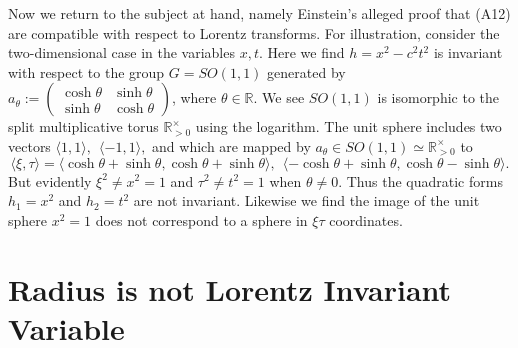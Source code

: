 \documentclass[12pt]{amsart}
\theoremstyle{definition}
\theoremstyle{remark}
\newcommand{\bR}{\mathbb{R}}
\newcommand{\del}{\partial}
\begin{document}
Now we return to the subject at hand, namely Einstein's alleged proof that (A12) are compatible with respect to Lorentz transforms. For illustration, consider the two-dimensional case in the variables $x,t$. Here we find $h=x^2-c^2 t^2$ is invariant with respect to the group $G=SO(1,1)$ generated by $a_\theta:=\begin{pmatrix} \cosh \theta & \sinh \theta \\
\sinh \theta & \cosh \theta
\end{pmatrix}$, where $\theta\in \bR$. We see $SO(1,1)$ is isomorphic to the split multiplicative torus $\bR^\times _{>0}$ using the logarithm. The unit sphere includes two vectors $\langle 1, 1 \rangle,~~ \langle -1,1\rangle,$ and which are mapped by $a_\theta \in SO(1,1) \simeq \bR^\times_{>0}$ to $$\langle \xi,\tau\rangle=\langle \cosh \theta+\sinh \theta, \cosh \theta+\sinh \theta \rangle,~~ \langle -\cosh \theta+\sinh \theta, \cosh \theta-\sinh \theta \rangle.$$ But evidently $\xi^2 \neq x^2=1$ and $\tau^2 \neq t^2=1$ when $\theta\neq 0$. Thus the quadratic forms $h_1=x^2$ and $h_2=t^2$ are not invariant. Likewise we find the image of the unit sphere $x^2=1$ does not correspond to a sphere in $\xi \tau$ coordinates. %


\section{Radius is not Lorentz Invariant Variable}
\end{document}
